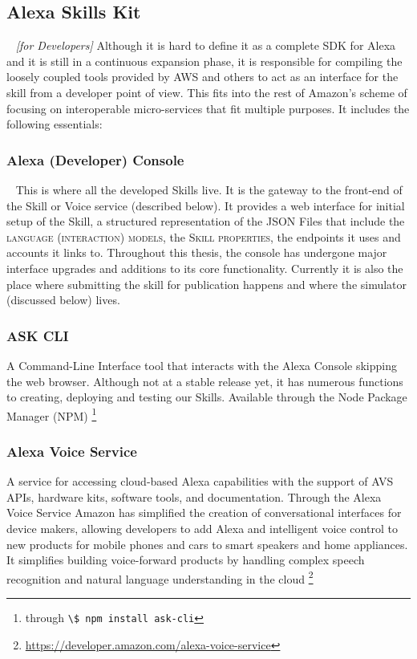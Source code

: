 	
	\subsection*{Alexa Skills Kit}~\label{ask:def} \textit{[for Developers]} Although it is hard to define it as a complete SDK for Alexa and it is still in a continuous expansion phase, it is responsible for compiling the loosely coupled tools provided by AWS and others to act as an interface for the skill from a developer point of view. This fits into the rest of Amazon's scheme of focusing on interoperable micro-services that fit multiple purposes. It includes the following essentials:
	
	
		\subsubsection*{Alexa (Developer) Console}~\label{ask:devconsole} This is where all the developed Skills live. It is the gateway to the front-end of the Skill or Voice service (described below). It provides a web interface for initial setup of the Skill, a structured representation of the JSON Files that include the \textsc{language (interaction) models}, the \textsc{Skill properties}, the endpoints it uses and accounts it links to. 
		Throughout this thesis, the console has undergone major interface upgrades and additions to its core functionality. Currently it is also the place where submitting the skill for publication happens and where the simulator (discussed below) lives.
		
		\subsubsection*{ASK CLI} %
		A Command-Line Interface tool that interacts with the Alexa Console skipping the web browser. %
		Although not at a stable release yet, it has numerous functions to creating, deploying and testing our Skills. %
		Available through the Node Package Manager (NPM) \footnote{
			through \lstinline|\$ npm install ask-cli| }
		
		
		\subsubsection*{Alexa Voice Service} %
		 A service for accessing cloud-based Alexa capabilities with the support of AVS APIs, hardware kits, software tools, and documentation. Through the Alexa Voice Service Amazon has simplified the creation of conversational interfaces for device makers, allowing developers to add Alexa and intelligent voice control to new products for mobile phones and cars to smart speakers and home appliances.
		 It simplifies building voice-forward products by handling complex speech recognition and natural language understanding in the cloud \footnote{\url{https://developer.amazon.com/alexa-voice-service}}


